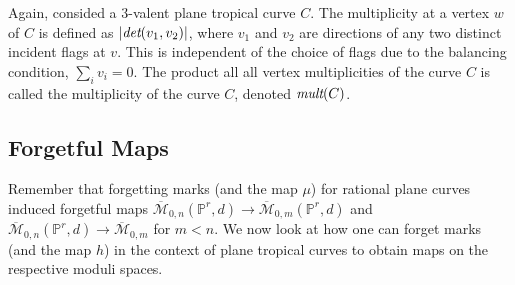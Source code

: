\begin{definition}
    Again, consided a $3$-valent plane tropical curve $C$.
    The multiplicity at a vertex $w$ of $C$ is defined as $|\emph{det}(v_{1},v_{2})|$, where $v_{1}$ and $v_{2}$ are directions of any two distinct incident flags at $v$.
    This is independent of the choice of flags due to the balancing condition, $\sum_{i}v_{i} = 0$.
    The product all all vertex multiplicities of the curve $C$ is called the multiplicity of the curve $C$, denoted $\emph{mult}(C)$.
\end{definition}
\subsection{Forgetful Maps}

Remember that forgetting marks (and the map $\mu$) for rational plane curves induced forgetful maps $\overline{\mathcal{M}}_{0,n}(\mathbb{P}^{r},d) \to \overline{\mathcal{M}}_{0,m}(\mathbb{P}^{r},d)$ and $\overline{\mathcal{M}}_{0,n}(\mathbb{P}^{r},d) \to \overline{\mathcal{M}}_{0,m}$ for $m<n$.
We now look at how one can forget marks (and the map $h$) in the context of plane tropical curves to obtain maps on the respective moduli spaces.
\begin{definition}
    
\end{definition}

\begin{remark}
    
\end{remark}

\begin{definition}
    
\end{definition}

